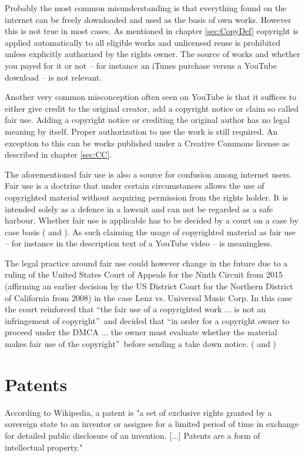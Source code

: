 \documentclass[a4paper]{report}
\begin{document}
Probably the most common misunderstanding is that everything found on the internet can be freely downloaded and used as the basis of own works. However this is not true in most cases. As mentioned in chapter \ref{sec:CopyDef} copyright is applied automatically to all eligible works and unlicensed reuse is prohibited unless explicitly authorized by the rights owner. The source of works and whether you payed for it or not -- for instance an iTunes purchase versus a YouTube download -- is not relevant.

Another very common misconception often seen on YouTube is that it suffices to either give credit to the original creator, add a copyright notice or claim so called fair use. \parencite{Vorys2013} Adding a copyright notice or crediting the original author has no legal meaning by itself. Proper authorization to use the work is still required. An exception to this can be works published under a Creative Commons license as described in chapter \ref{sec:CC}.

The aforementioned fair use is also a source for confusion among internet users. Fair use is a doctrine that under certain circumstances allows the use of copyrighted material without acquiring permission from the rights holder. It is intended solely as a defence in a lawsuit and can not be regarded as a safe harbour. Whether fair use is applicable has to be decided by a court on a case by case basis (\cite{WikiFair} and \cite{Vorys2013}). As such claiming the usage of copyrighted material as fair use -- for instance in the description text of a YouTube video -- is meaningless.

The legal practice around fair use could however change in the future due to a ruling of the United States Court of Appeals for the Ninth Circuit from 2015 (affirming an earlier decision by the US District Court for the Northern District of California from 2008) in the case Lenz vs. Universal Music Corp. In this case the court reinforced that \textquotedblleft the fair use of a copyrighted work ... is not an infringement of copyright\textquotedblright\ and decided that \textquotedblleft in order for a copyright owner to proceed under the DMCA ... the owner must evaluate whether the material makes fair use of the copyright\textquotedblright\ before sending a take down notice. (\cite{LenzUniversal} and \cite{WikiLenzUniversal})

\section{Patents}
\label{sec:Patents}
According to Wikipedia, a patent is "a set of exclusive rights granted by a sovereign state to an inventor or assignee for a limited period of time in exchange for detailed public disclosure of an invention. [...]  Patents are a form of intellectual property." \parencite{WikiPatent2017}
\end{document}
